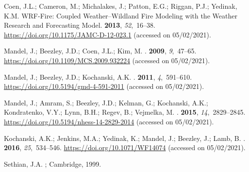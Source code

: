 \documentclass[atmosphere,article,accept,moreauthors,pdftex]{Definitions/mdpi}
\begin{document}
\begin{thebibliography}{999}
Coen, J.L.; Cameron, M.; Michalakes, J.; Patton, E.G.; Riggan, P.J.; Yedinak,
  K.M.
\newblock WRF-Fire: Coupled Weather–Wildland Fire Modeling with the Weather
  Research and Forecasting Model.
 {\bf 2013}, {\em
  52},~16--38.
\newblock
  \href{https://doi.org/10.1175/JAMC-D-12-023.1}{https://doi.org/10.1175/JAMC-D-12-023.1} (accessed on 05/02/2021).

Mandel, J.; Beezley, J.D.; Coen, J.L.; Kim, M.
.
 {\bf 2009}, {\em 9},~47–65.
\newblock
  \href{https://doi.org/10.1109/MCS.2009.932224}{https://doi.org/10.1109/MCS.2009.932224} (accessed on 05/02/2021).

Mandel, J.; Beezley, J.D.; Kochanski, A.K.
.
 {\bf 2011}, {\em 4},~591--610.
\newblock
  \href{https://doi.org/10.5194/gmd-4-591-2011}{https://doi.org/10.5194/gmd-4-591-2011} (accessed on 05/02/2021).

Mandel, J.; Amram, S.; Beezley, J.D.; Kelman, G.; Kochanski, A.K.; Kondratenko,
  V.Y.; Lynn, B.H.; Regev, B.; Vejmelka, M.
.
 {\bf 2015}, {\em 14},~2829--2845.
\newblock
  \href{https://doi.org/10.5194/nhess-14-2829-2014}{https://doi.org/10.5194/nhess-14-2829-2014} (accessed on 05/02/2021).

Kochanski, A.K.; Jenkins, M.A.; Yedinak, K.; Mandel, J.; Beezley, J.; Lamb, B.
.
 {\bf 2016}, {\em 25},~534–546.
\newblock
  \href{https://doi.org/10.1071/WF14074}{https://doi.org/10.1071/WF14074} (accessed on 05/02/2021).

Sethian, J.A.
; Cambridge,  1999.


\end{thebibliography}
\end{document}
